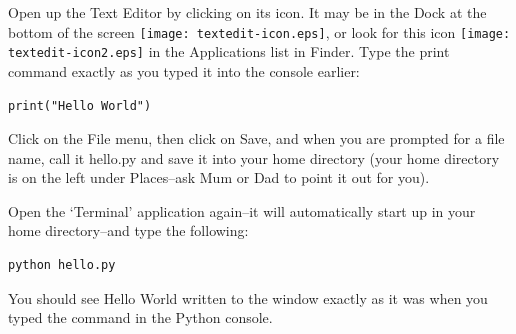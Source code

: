 \begin{MAC}
Open up the Text Editor by clicking on its icon.  It may be in the Dock at the bottom of the screen \texttt{[image: textedit-icon.eps]}, or look for this icon \texttt{[image: textedit-icon2.eps]} in the Applications list in Finder.  Type the print command exactly as you typed it into the console earlier:

\begin{listing}
\begin{verbatim}
print("Hello World")
\end{verbatim}
\end{listing}

Click on the File menu, then click on Save, and when you are prompted for a file name, call it hello.py and save it into your home directory (your home directory is on the left under Places--ask Mum or Dad to point it out for you).

Open the `Terminal' application again--it will automatically start up in your home directory--and type the following:

\begin{listing}
\begin{verbatim}
python hello.py
\end{verbatim}
\end{listing}

You should see Hello World written to the window exactly as it was when you typed the command in the Python console.

\end{MAC}

